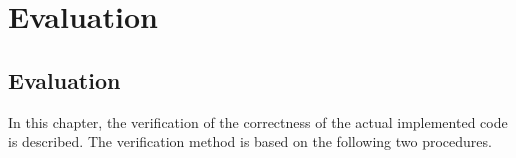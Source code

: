 \chapter{Evaluation}
\label{evaluation}

\section{Evaluation}
In this chapter, the verification of the correctness of the actual implemented code is described. 
The verification method is based on the following two procedures.




